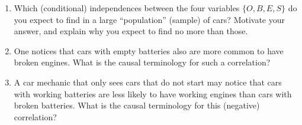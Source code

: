 \begin{enumerate}[label=\alph*)]
{\begin{center}
\end{center}}
    \points{}
  \item Which (conditional) independences between the four variables $\{O,B,E,S\}$ do you expect to find in a large ``population'' (sample) of cars? Motivate your answer, and explain why you expect to find no more than those.
  \item One notices that cars with empty batteries also are more common to have broken engines. What is the causal terminology for such a correlation?
  \item A car mechanic that only sees cars that do not start may notice that cars with working batteries are less likely to have working engines than cars with broken batteries. What is the causal terminology for this (negative) correlation?
\end{enumerate}
